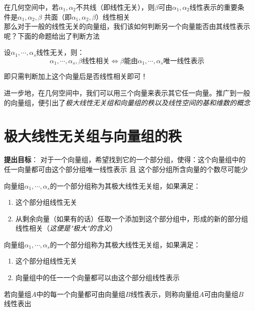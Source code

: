 在几何空间中，若$\alpha_1, \alpha_2$不共线（即线性无关），则$\beta$可由$\alpha_1, \alpha_2$线性表示的重要条件是$\alpha_1, \alpha_2, \beta$
共面（即$\alpha_1, \alpha_2, \beta$）线性相关\\
那么对于一般的线性无关的向量组，我们该如何判断另一个向量能否由其线性表示呢？下面的命题给出了判断方法
\begin{proposition}
    设$\alpha_1, \cdots, \alpha_s$线性无关，则：
    \begin{equation*}
        \alpha_1, \cdots, \alpha_s, \beta \text{线性相关}\Leftrightarrow\beta\text{能由}\alpha_1, \cdots, \alpha_s\text{唯一线性表示}
    \end{equation*}
\end{proposition}
即只需判断加上这个向量后是否线性相关即可！

进一步地，在几何空间中，我们可以用三个向量来表示其它任一向量。推广到一般的向量组，便引出了\emph{极大线性无关组和向量组的秩以及线性空间的基和维数的概念}

\section{极大线性无关组与向量组的秩}
\textbf{提出目标}：
对于一个向量组，希望找到它的一个部分组，使得：这个向量组中的任一向量都可由这个部分组唯一线性表示 且 这个部分组所含向量的个数尽可能少

\begin{definition}[极大线性无关组]
    向量组$\alpha_1, \cdots, \alpha_s$的一个部分组称为其极大线性无关组，如果满足：
    \begin{enumerate}
        \item 这个部分组线性无关
        \item 从剩余向量（如果有的话）任取一个添加到这个部分组中，形成的新的部分组线性相关（\emph{这便是"极大"的含义}）
    \end{enumerate}
\end{definition}

\begin{definition}[极大无关组的等价定义-1]
    向量组$\alpha_1, \cdots, \alpha_s$的一个部分组称为其极大线性无关组，如果满足：
    \begin{enumerate}
        \item 这个部分组线性无关
        \item 向量组中的任一一个向量都可以由这个部分组线性表示
    \end{enumerate}
\end{definition}

\begin{definition}[向量组的线性表出]
    若向量组$A$中的每一个向量都可由向量组$B$线性表示，则称向量组$A$可由向量组$B$线性表出
\end{definition}

